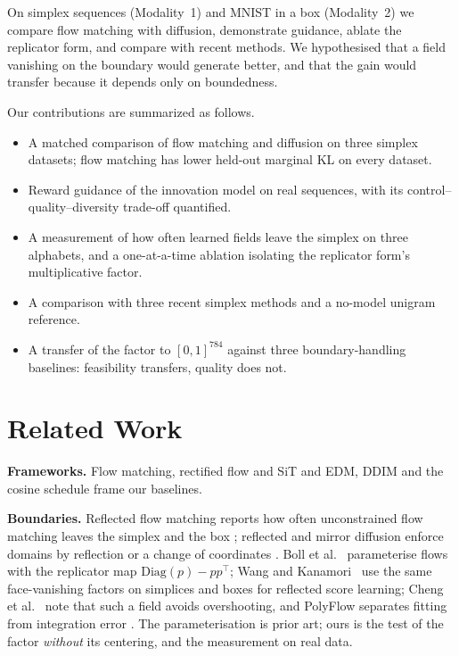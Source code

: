 \documentclass{article}
\begin{document}
On simplex sequences (Modality~1) and MNIST in a box (Modality~2) we compare flow matching with
diffusion, demonstrate guidance, ablate the replicator form, and compare with recent methods. We
hypothesised that a field vanishing on the boundary would generate better, and that the gain would
transfer because it depends only on boundedness.

Our contributions are summarized as follows.
\begin{itemize}[leftmargin=1.2em,itemsep=0pt,topsep=2pt]
  \item A matched comparison of flow matching and diffusion on three simplex datasets; flow matching
        has lower held-out marginal KL on every dataset.
  \item Reward guidance of the innovation model on real sequences, with its control--quality--diversity
        trade-off quantified.
  \item A measurement of how often learned fields leave the simplex on three alphabets, and a
        one-at-a-time ablation isolating the replicator form's multiplicative factor.
  \item A comparison with three recent simplex methods and a no-model unigram reference.
  \item A transfer of the factor to $[0,1]^{784}$ against three boundary-handling baselines:
        feasibility transfers, quality does not.
\end{itemize}

\section{Related Work}

\textbf{Frameworks.} Flow matching, rectified flow and SiT \citep{lipman2022flow,liu2023rectified,ma2024sit}
and EDM, DDIM and the cosine schedule \citep{karras2022edm,song2021ddim,nichol2021improved} frame our baselines.

\textbf{Boundaries.} Reflected flow matching reports how often unconstrained flow matching leaves the
simplex and the box \citep{xie2024reflected}; reflected and mirror diffusion enforce domains by
reflection or a change of coordinates \citep{lou2023reflected,liu2023mirror,fishman2023constrained}.
Boll et al.~\citep{boll2024assignment} parameterise flows with the replicator map
$\mathrm{Diag}(p)-pp^\top$; Wang and Kanamori~\citep{wang2026conormal} use the same face-vanishing
factors on simplices and boxes for reflected score learning; Cheng et al.~\citep{cheng2024statistical} note that such a field avoids overshooting, and
PolyFlow separates fitting from integration error \citep{ma2026polyflow}. The
parameterisation is prior art; ours is the test of the factor \emph{without} its centering, and the
measurement on real data.
\end{document}
